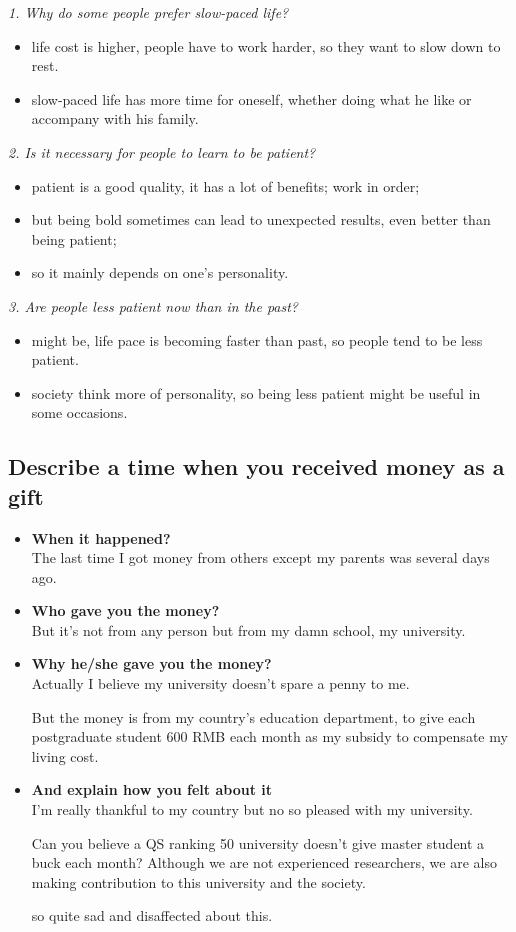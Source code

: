 \documentclass[conference]{IEEEtran}
\begin{document}
\textit{1. Why do some people prefer slow-paced life?}
\begin{itemize}
    \item life cost is higher, people have to work harder, so they want to slow down to rest.
    \item slow-paced life has more time for oneself, whether doing what he like or accompany with his family.
\end{itemize}

\textit{2. Is it necessary for people to learn to be patient?}
\begin{itemize}
    \item patient is a good quality, it has a lot of benefits; work in order;
    \item but being bold sometimes can lead to unexpected results, even better than being patient;
    \item so it mainly depends on one's personality.
\end{itemize}

\textit{3. Are people less patient now than in the past?}
\begin{itemize}
    \item might be, life pace is becoming faster than past, so people tend to be less patient.
    \item society think more of personality, so being less patient might be useful in some occasions.
\end{itemize}

\subsection{Describe a time when you received money as a gift}
\begin{itemize}
    \item \textbf{When it happened?}\\
    The last time I got money from others except my parents was several days ago.
    \item \textbf{Who gave you the money?}\\
    But it's not from any person but from my damn school, my university.
    \item \textbf{Why he/she gave you the money?}\\
    Actually I believe my university doesn't spare a penny to me.

    But the money is from my country's education department, to give each postgraduate student 600 RMB each month as
    my subsidy to compensate my living cost.
    \item \textbf{And explain how you felt about it}\\
    I'm really thankful to my country but no so pleased with my university.

    Can you believe a QS ranking 50 university doesn't give master student a buck each month?
    Although we are not experienced researchers, we are also making contribution to this university and the society.

    so quite sad and disaffected about this.
\end{itemize}
\end{document}
